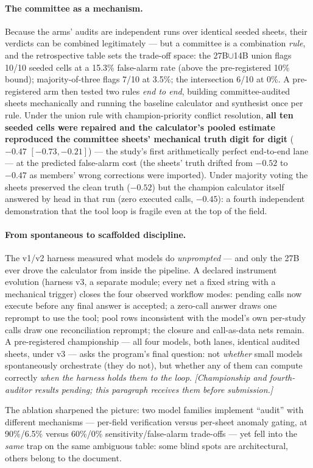 \paragraph{The committee as a mechanism.} Because the arms' audits are independent runs over identical seeded sheets, their verdicts can be combined legitimately --- but a committee is a combination \emph{rule}, and the retrospective table sets the trade-off space: the 27B$\cup$14B union flags 10/10 seeded cells at a 15.3\% false-alarm rate (above the pre-registered 10\% bound); majority-of-three flags 7/10 at 3.5\%; the intersection 6/10 at 0\%. A pre-registered arm then tested two rules \emph{end to end}, building committee-audited sheets mechanically and running the baseline calculator and synthesist once per rule. Under the union rule with champion-priority conflict resolution, \textbf{all ten seeded cells were repaired and the calculator's pooled estimate reproduced the committee sheets' mechanical truth digit for digit} ($-0.47$ $[-0.73, -0.21]$) --- the study's first arithmetically perfect end-to-end lane --- at the predicted false-alarm cost (the sheets' truth drifted from $-0.52$ to $-0.47$ as members' wrong corrections were imported). Under majority voting the sheets preserved the clean truth ($-0.52$) but the champion calculator itself answered by head in that run (zero executed calls, $-0.45$): a fourth independent demonstration that the tool loop is fragile even at the top of the field.

\paragraph{From spontaneous to scaffolded discipline.} The v1/v2 harness measured what models do \emph{unprompted} --- and only the 27B ever drove the calculator from inside the pipeline. A declared instrument evolution (harness v3, a separate module; every net a fixed string with a mechanical trigger) closes the four observed workflow modes: pending calls now execute before any final answer is accepted; a zero-call answer draws one reprompt to use the tool; pool rows inconsistent with the model's own per-study calls draw one reconciliation reprompt; the closure and call-as-data nets remain. A pre-registered championship --- all four models, both lanes, identical audited sheets, under v3 --- asks the program's final question: not \emph{whether} small models spontaneously orchestrate (they do not), but whether any of them can compute correctly \emph{when the harness holds them to the loop}. \emph{[Championship and fourth-auditor results pending; this paragraph receives them before submission.]}



The ablation sharpened the picture: two model families implement ``audit'' with different mechanisms --- per-field verification versus per-sheet anomaly gating, at 90\%/6.5\% versus 60\%/0\% sensitivity/false-alarm trade-offs --- yet fell into the \emph{same} trap on the same ambiguous table: some blind spots are architectural, others belong to the document. 


